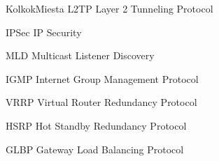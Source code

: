 \begin{seznamzkratek}{KolkokMiesta}
	{L2TP} %
	{Layer 2 Tunneling Protocol} %
	
	{IPSec} %
	{IP Security} %

	{MLD} %
	{Multicast Listener Discovery} %
	
	{IGMP} %
	{Internet Group Management Protocol} %
	
	{VRRP} %
	{Virtual Router Redundancy Protocol} %

	{HSRP} %
	{Hot Standby Redundancy Protocol} %
	
	{GLBP} %
	{Gateway Load Balancing Protocol} %

\end{seznamzkratek}
